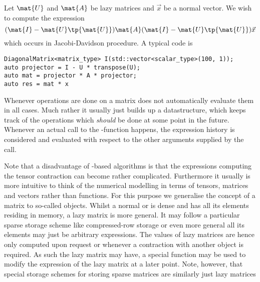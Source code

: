 Let $\mat{U}$ and $\mat{A}$ be lazy matrices and $\vec{x}$ be a normal vector.
We wish to compute the expression
\[ (\mat{I} - \mat{U} \tp{\mat{U}}) \mat{A} (\mat{I} - \mat{U} \tp{\mat{U}}) \vec{x} \]
which occurs in Jacobi-Davidson procedure.
A typical code is
\begin{lstlisting}
DiagonalMatrix<matrix_type> I(std::vector<scalar_type>(100, 1));
auto projector = I - U * transpose(U);
auto mat = projector * A * projector;
auto res = mat * x
\end{lstlisting}




\label{sec:lazymat}

Whenever operations are done on a matrix \lazyten does not automatically
evaluate them in all cases.
Much rather it usually just builds up a datastructure,
which keeps track of the operations which \textit{should} be done
at some point in the future.
Whenever an actual call to the \contraction-function happens,
the expression history is considered and evaluated with respect
to the other arguments supplied by the \contraction call.



Note that a disadvantage of \contraction-based algorithms is that the expressions
computing the tensor contraction can become rather complicated.
Furthermore it usually is more intuitive to think of the
numerical modelling in terms of tensors, matrices and vectors
rather than \contraction functions.
For this purpose we generalise the concept of a matrix
to so-called  objects.
Whilst a normal or  is dense and has all its elements
residing in memory,
a lazy matrix is more general.
It may follow a particular sparse storage scheme
like compressed-row storage
or even more general all its elements may just be arbitrary expressions.
The values of lazy matrices are hence only computed upon request
or whenever a contraction with another object is required.
As such the lazy matrix may have, \ie a special \update function
may be used to modify the expression of the lazy matrix
at a later point.
Note, however, that special storage schemes for storing
sparse matrices are similarly just lazy matrices 

